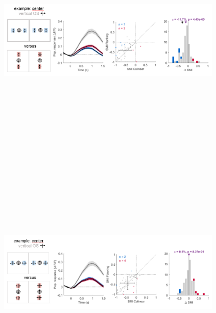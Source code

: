 \begin{figure}[H] \centering \includegraphics[width=12cm,height=12cm,keepaspectratio]{Figures/7.Results/finalPopulation/sel/diagrams/14.png} 
\end{figure}

\begin{figure}[H] \centering \includegraphics[width=12cm,height=12cm,keepaspectratio]{Figures/7.Results/finalPopulation/sel/diagrams/15.png} 
\end{figure}

